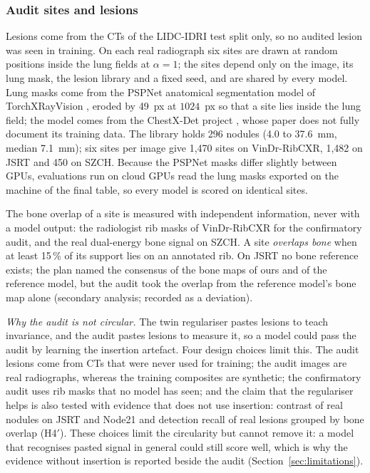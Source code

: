 \subsubsection{Audit sites and lesions}
\label{sec:m-audit}
Lesions come from the CTs of the LIDC-IDRI test split only, so no audited lesion was seen in training. On each real radiograph six sites are
drawn at random positions inside the lung fields at $\alpha=1$; the sites depend only on the image, its lung mask, the lesion library and a
fixed seed, and are shared by every model. Lung masks come from the PSPNet anatomical segmentation model of TorchXRayVision
\cite{cohen2022torchxrayvision}, eroded by 49~px at $1024$~px so that a site lies inside the lung field; the model comes from the ChestX-Det
project \cite{lian2021chestxdet}, whose paper does not fully document its training data. The library holds 296 nodules (4.0 to 37.6~mm,
median 7.1~mm); six sites per image give 1,470 sites on VinDr-RibCXR, 1,482 on JSRT and 450 on SZCH. Because the PSPNet masks differ
slightly between GPUs, evaluations run on cloud GPUs read the lung masks exported on the machine of the final table, so every model is
scored on identical sites.

The bone overlap of a site is measured with independent information, never with a model output: the radiologist rib masks of VinDr-RibCXR
\cite{nguyen2021ribcxr} for the confirmatory audit, and the real dual-energy bone signal on SZCH. A site \emph{overlaps bone} when at least
15\,\% of its support lies on an annotated rib. On JSRT no bone reference exists; the plan named the consensus of the bone maps of ours and
of the reference model, but the audit took the overlap from the reference model's bone map alone (secondary analysis; recorded as a
deviation).

\emph{Why the audit is not circular.} The twin regulariser pastes lesions to teach invariance, and the audit pastes lesions to measure it,
so a model could pass the audit by learning the insertion artefact. Four design choices limit this. The audit lesions come from CTs that
were never used for training; the audit images are real radiographs, whereas the training composites are synthetic; the confirmatory audit
uses rib masks that no model has seen; and the claim that the regulariser helps is also tested with evidence that does not use insertion:
contrast of real nodules on JSRT and Node21 and detection recall of real lesions grouped by bone overlap (H4$'$). These choices limit the
circularity but cannot remove it: a model that recognises pasted signal in general could still score well, which is why the evidence
without insertion is reported beside the audit (Section~\ref{sec:limitations}).

